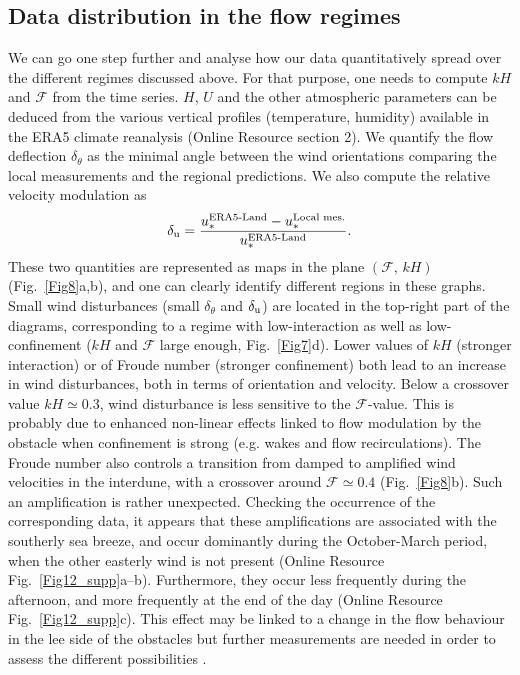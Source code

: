 \subsection{Data distribution in the flow regimes}
\label{DataDistribution}
We can go one step further and analyse how our data quantitatively spread over the different regimes discussed above. For that purpose, one needs to compute $kH$ and $\mathcal{F}$ from the time series. $H$, $U$ and the other atmospheric parameters can be deduced from the various vertical profiles (temperature, humidity) available in the ERA5 climate reanalysis (Online Resource section 2). We quantify the flow deflection $\delta_{\theta}$ as the minimal angle between the wind orientations comparing the local measurements and the regional predictions. We also compute the relative velocity modulation as
%
\begin{equation}
\delta_{\textup{u}} = \frac{u_{*}^{\textup{ERA5-Land}} -  u_{*}^{\textup{Local mes.}}}{u_{*}^{\textup{ERA5-Land}}}.
\end{equation}
%
These two quantities are represented as maps in the plane $(\mathcal{F}, \, kH)$ (Fig.~\ref{Fig8}a,b), and one can clearly identify different regions in these graphs. Small wind disturbances (small $\delta_{\theta}$ and $\delta_{\textup{u}}$) are located in the top-right part of the diagrams, corresponding to a regime with low-interaction as well as low-confinement ($k H$ and $\mathcal{F}$ large enough, Fig.~\ref{Fig7}d). Lower values of $k H$ (stronger interaction) or of Froude number (stronger confinement) both lead to an increase in wind disturbances, both in terms of orientation and velocity. Below a crossover value $k H \simeq 0.3$, wind disturbance is less sensitive to the $\mathcal{F}$-value. This is probably due to enhanced non-linear effects linked to flow modulation by the obstacle when confinement is strong (e.g. wakes and flow recirculations). The Froude number also controls a transition from damped to amplified wind velocities in the interdune, with a crossover around $\mathcal{F} \simeq 0.4$ (Fig.~\ref{Fig8}b). Such an amplification is rather unexpected. Checking the occurrence of the corresponding data, it appears that these amplifications are associated with the southerly sea breeze, and occur dominantly during the October-March period, when the other easterly wind is not present (Online Resource Fig.~\ref{Fig12_supp}a--b). Furthermore, they occur less frequently during the afternoon, and more frequently at the end of the day (Online Resource Fig.~\ref{Fig12_supp}c). This effect may be linked to a change in the flow behaviour in the lee side of the obstacles but further measurements are needed in order to assess the different possibilities \citep{baines1995, Vosper2004}.

